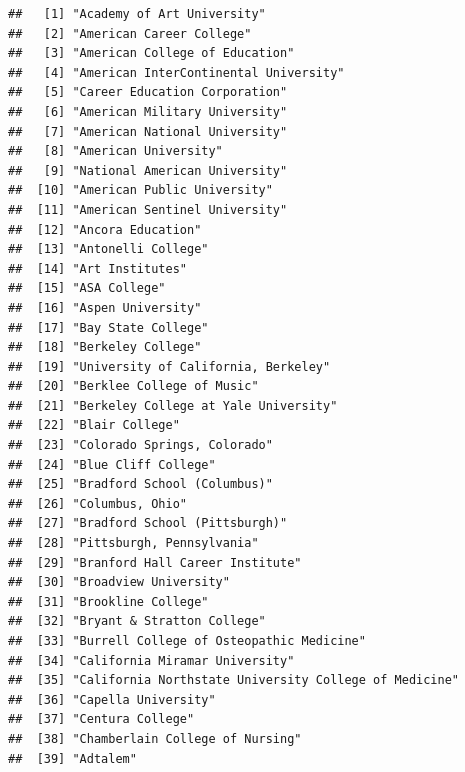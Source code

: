 \documentclass[
]{article}
\begin{document}
\begin{verbatim}
##   [1] "Academy of Art University"                             
##   [2] "American Career College"                               
##   [3] "American College of Education"                         
##   [4] "American InterContinental University"                  
##   [5] "Career Education Corporation"                          
##   [6] "American Military University"                          
##   [7] "American National University"                          
##   [8] "American University"                                   
##   [9] "National American University"                          
##  [10] "American Public University"                            
##  [11] "American Sentinel University"                          
##  [12] "Ancora Education"                                      
##  [13] "Antonelli College"                                     
##  [14] "Art Institutes"                                        
##  [15] "ASA College"                                           
##  [16] "Aspen University"                                      
##  [17] "Bay State College"                                     
##  [18] "Berkeley College"                                      
##  [19] "University of California, Berkeley"                    
##  [20] "Berklee College of Music"                              
##  [21] "Berkeley College at Yale University"                   
##  [22] "Blair College"                                         
##  [23] "Colorado Springs, Colorado"                            
##  [24] "Blue Cliff College"                                    
##  [25] "Bradford School (Columbus)"                            
##  [26] "Columbus, Ohio"                                        
##  [27] "Bradford School (Pittsburgh)"                          
##  [28] "Pittsburgh, Pennsylvania"                              
##  [29] "Branford Hall Career Institute"                        
##  [30] "Broadview University"                                  
##  [31] "Brookline College"                                     
##  [32] "Bryant & Stratton College"                             
##  [33] "Burrell College of Osteopathic Medicine"               
##  [34] "California Miramar University"                         
##  [35] "California Northstate University College of Medicine"  
##  [36] "Capella University"                                    
##  [37] "Centura College"                                       
##  [38] "Chamberlain College of Nursing"                        
##  [39] "Adtalem"                                               

\end{verbatim}
\end{document}
